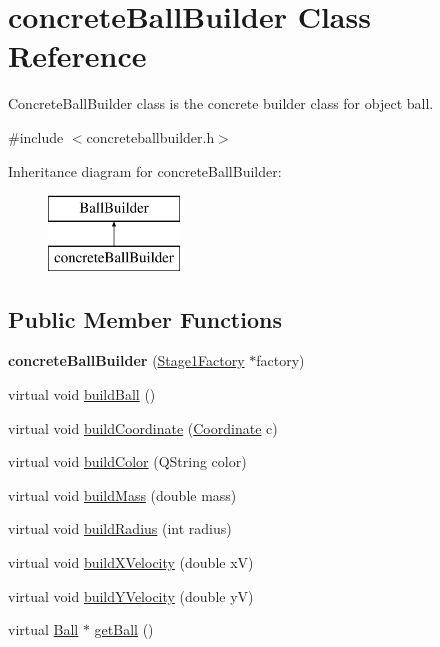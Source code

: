 \hypertarget{classconcrete_ball_builder}{}\section{concrete\+Ball\+Builder Class Reference}
\label{classconcrete_ball_builder}


Concrete\+Ball\+Builder class is the concrete builder class for object ball.  




{\ttfamily \#include $<$concreteballbuilder.\+h$>$}

Inheritance diagram for concrete\+Ball\+Builder\+:\begin{figure}[H]
\begin{center}
\leavevmode
\includegraphics[height=2.000000cm]{classconcrete_ball_builder}
\end{center}
\end{figure}
\subsection*{Public Member Functions}
\begin{DoxyCompactItemize}
\item 
\mbox{\label{classconcrete_ball_builder_a9085a8f83babb942502ebc105ce01b34}} 
{\bfseries concrete\+Ball\+Builder} (\mbox{\hyperlink{class_stage1_factory}{Stage1\+Factory}} $\ast$factory)
\item 
virtual void \mbox{\hyperlink{classconcrete_ball_builder_a882e6217ebab232ee2a3d0af63c43b5a}{build\+Ball}} ()
\item 
virtual void \mbox{\hyperlink{classconcrete_ball_builder_ae4ddab3b62cc22f9f85d9bd3829830c4}{build\+Coordinate}} (\mbox{\hyperlink{class_coordinate}{Coordinate}} c)
\item 
virtual void \mbox{\hyperlink{classconcrete_ball_builder_afec6299653c5c810708254d3e32b6368}{build\+Color}} (Q\+String color)
\item 
virtual void \mbox{\hyperlink{classconcrete_ball_builder_a74b84331ccf45c4880bf3a9bda6bfb22}{build\+Mass}} (double mass)
\item 
virtual void \mbox{\hyperlink{classconcrete_ball_builder_aa85cf84c6c3cf21e9e4ad83c250d0e58}{build\+Radius}} (int radius)
\item 
virtual void \mbox{\hyperlink{classconcrete_ball_builder_a45c8c4aaf54af6e5f619ccc3d0c62924}{build\+X\+Velocity}} (double xV)
\item 
virtual void \mbox{\hyperlink{classconcrete_ball_builder_a6054b9012af3247b16f2e1c4040555cb}{build\+Y\+Velocity}} (double yV)
\item 
virtual \mbox{\hyperlink{class_ball}{Ball}} $\ast$ \mbox{\hyperlink{classconcrete_ball_builder_a31311259bb9ba3580b4a0b190cbc938b}{get\+Ball}} ()
\end{DoxyCompactItemize}
